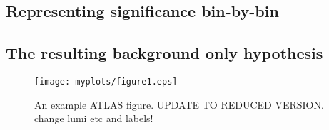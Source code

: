 \documentclass[UKenglish]{latex/atlasdoc}
\begin{document}
\subsection{Representing significance bin-by-bin}
\label{subsec:significance}

\subsection{The resulting background only hypothesis}
\label{subsec:bkgonly}

\begin{figure}[htbp]
 \centering
  \texttt{[image: myplots/figure1.eps]}
  \caption{An example ATLAS figure. UPDATE TO REDUCED VERSION. change lumi etc and labels!}
  \label{fig:example}
\end{figure}

\end{document}
